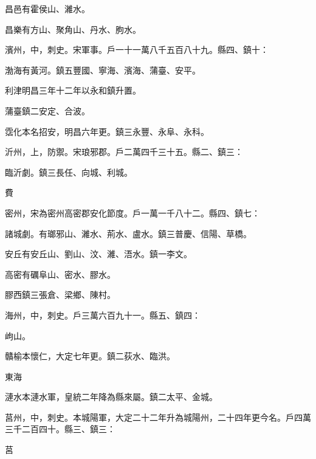 \begin{pinyinscope}
 昌邑有霍侯山、濰水。



 昌樂有方山、聚角山、丹水、朐水。



 濱州，中，刺史。宋軍事。戶一十一萬八千五百八十九。縣四、鎮十：



 渤海有黃河。鎮五豐國、寧海、濱海、蒲臺、安平。



 利津明昌三年十二年以永和鎮升置。



 蒲臺鎮二安定、合波。



 霑化本名招安，明昌六年更。鎮三永豐、永阜、永科。



 沂州，上，防禦。宋琅邪郡。戶二萬四千三十五。縣二、鎮三：



 臨沂劇。鎮三長任、向城、利城。



 費



 密州，宋為密州高密郡安化節度。戶一萬一千八十二。縣四、鎮七：



 諸城劇。有瑯邪山、濰水、荊水、盧水。鎮三普慶、信陽、草橋。



 安丘有安丘山、劉山、汶、濰、浯水。鎮一李文。



 高密有礪阜山、密水、膠水。



 膠西鎮三張倉、梁鄉、陳村。



 海州，中，刺史。戶三萬六百九十一。縣五、鎮四：



 岣山。



 贛榆本懷仁，大定七年更。鎮二荻水、臨洪。



 東海



 漣水本漣水軍，皇統二年降為縣來屬。鎮二太平、金城。



 莒州，中，刺史。本城陽軍，大定二十二年升為城陽州，二十四年更今名。戶四萬三千二百四十。縣三、鎮三：



 莒




\end{pinyinscope}
